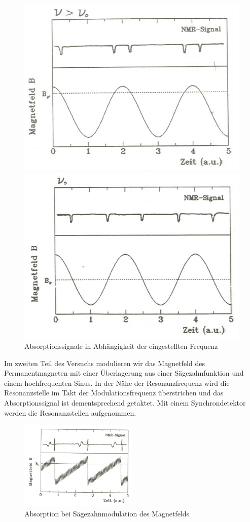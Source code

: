 \begin{figure}[H]
\begin{minipage}{0.5\textwidth}
\centering \includegraphics[width=\textwidth]{Bilder/vb1.png}
\end{minipage}
\begin{minipage}{0.5\textwidth}
\centering \includegraphics[width=\textwidth]{Bilder/vb2.png}
\end{minipage}
\caption{Absorptionssignale in Abhängigkeit der eingestellten Frequenz}
\end{figure}

Im zweiten Teil des Versuchs modulieren wir das Magnetfeld des Permanentmagneten mit einer Überlagerung aus einer Sägezahnfunktion und einem hochfrequenten Sinus. In der Nähe der Resonanzfrequenz wird die Resonanzstelle im Takt der Modulationsfrequenz überstrichen und das Absorptionssignal ist dementsprechend getaktet. Mit einem Synchrondetektor werden die Resonanzstellen aufgenommen.

\begin{figure}[H]
\centering \includegraphics[width=0.5\textwidth]{Bilder/vb3.png}
\caption{Absorption bei Sägezahnmodulation des Magnetfelds}
\end{figure}